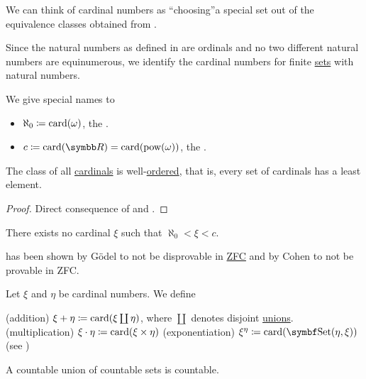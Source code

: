 \begin{remark}\label{remark:cardinals}
  We can think of cardinal numbers as \enquote{choosing}\AOC a special set out of the equivalence classes obtained from .

  Since the natural numbers as defined in  are ordinals and no two different natural numbers are equinumerous, we identify the cardinal numbers for finite \hyperref[def:finite_set]{sets} with natural numbers.

  We give special names to
  \begin{itemize}
    \item \( \aleph_0 \coloneqq \operatorname{card}(\omega) \), the .
    \item \( c \coloneqq \Card(\BR) = \Card(\Pow(\omega)) \), the .
  \end{itemize}
\end{remark}

\begin{proposition}\label{thm:cardinals_well_ordered}
  The class of all \hyperref[def:cardinal]{cardinals} is well-\hyperref[def:well_ordered_set]{ordered}, that is, every set of cardinals has a least element.
\end{proposition}
\begin{proof}
  Direct consequence of  and .
\end{proof}

\begin{hypothesis}\label{hyp:continuum_hypothesis}\cite[165]{Enderton1977}
  There exists no cardinal \( \xi \) such that \( \aleph_0 < \xi < c \).
\end{hypothesis}

\begin{remark}\label{remark:continuum_hypothesis}\cite[165]{Enderton1977}
   has been shown by G\"odel to not be disprovable in \hyperref[def:set_zfc]{ZFC} and by Cohen to not be provable in ZFC.
\end{remark}

\begin{definition}\label{def:cardinal_arithmetic}
  Let \( \xi \) and \( \eta \) be cardinal numbers. We define
  \begin{description}
    (addition) \( \xi + \eta \coloneqq \operatorname{card}(\xi \coprod \eta) \), where \( \coprod \) denotes disjoint \hyperref[def:disjoint_union]{unions}.
    (multiplication) \( \xi \cdot \eta \coloneqq \operatorname{card}(\xi \times \eta) \)
    (exponentiation) \( \xi^\eta \coloneqq \Card(\Cat{Set}(\eta, \xi)) \) (see )
  \end{description}
\end{definition}

\begin{proposition}\label{thm:countable_union_of_countable_sets}\cite[Theorem6Q]{Enderton1977}
  A countable union of countable sets is countable.
\end{proposition}
